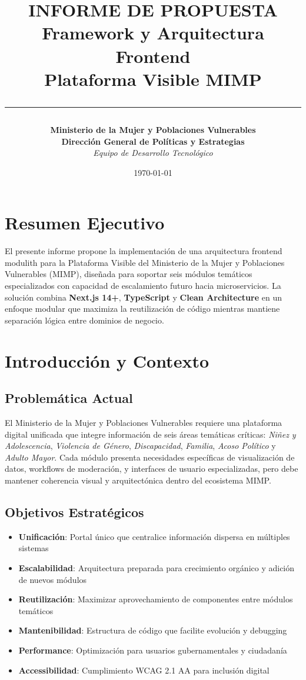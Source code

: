 \documentclass[12pt,a4paper]{article}
\title{
    \vspace{-2cm}
    \textbf{\Large INFORME DE PROPUESTA} \\
    \textbf{\LARGE Framework y Arquitectura Frontend} \\
    \textbf{\Large Plataforma Visible MIMP} \\
    \vspace{0.5cm}
    \textcolor{mimpPrimary}{\rule{\textwidth}{2pt}}
}
\author{
    \textbf{Ministerio de la Mujer y Poblaciones Vulnerables} \\
    \textbf{Dirección General de Políticas y Estrategias} \\
    \textit{Equipo de Desarrollo Tecnológico}
}
\date{\today}
\begin{document}
\maketitle

\section*{Resumen Ejecutivo}

El presente informe propone la implementación de una arquitectura frontend modulith para la Plataforma Visible del Ministerio de la Mujer y Poblaciones Vulnerables (MIMP), diseñada para soportar seis módulos temáticos especializados con capacidad de escalamiento futuro hacia microservicios. La solución combina \textbf{Next.js 14+}, \textbf{TypeScript} y \textbf{Clean Architecture} en un enfoque modular que maximiza la reutilización de código mientras mantiene separación lógica entre dominios de negocio.

\tableofcontents
\newpage

\section{Introducción y Contexto}

\subsection{Problemática Actual}

El Ministerio de la Mujer y Poblaciones Vulnerables requiere una plataforma digital unificada que integre información de seis áreas temáticas críticas: \textit{Niñez y Adolescencia}, \textit{Violencia de Género}, \textit{Discapacidad}, \textit{Familia}, \textit{Acoso Político} y \textit{Adulto Mayor}. Cada módulo presenta necesidades específicas de visualización de datos, workflows de moderación, y interfaces de usuario especializadas, pero debe mantener coherencia visual y arquitectónica dentro del ecosistema MIMP.

\subsection{Objetivos Estratégicos}

\begin{itemize}
    \item \textbf{Unificación}: Portal único que centralice información dispersa en múltiples sistemas
    \item \textbf{Escalabilidad}: Arquitectura preparada para crecimiento orgánico y adición de nuevos módulos
    \item \textbf{Reutilización}: Maximizar aprovechamiento de componentes entre módulos temáticos
    \item \textbf{Mantenibilidad}: Estructura de código que facilite evolución y debugging
    \item \textbf{Performance}: Optimización para usuarios gubernamentales y ciudadanía
    \item \textbf{Accessibilidad}: Cumplimiento WCAG 2.1 AA para inclusión digital
\end{itemize}
\end{document}
